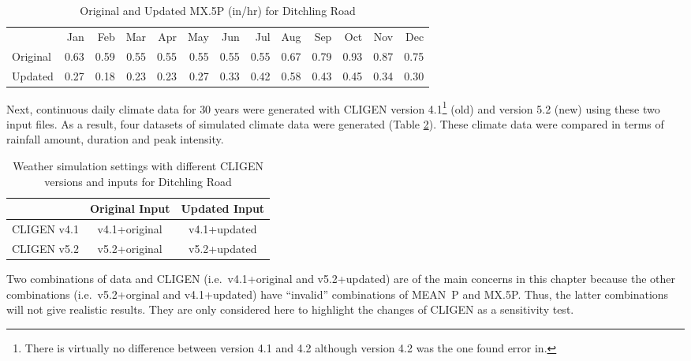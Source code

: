 \begin{table}[htbp]
  \centering
  \caption[Original and Updated {MX.5P} for Ditchling Road]{Original and
Updated {MX.5P} (in/hr) for Ditchling Road}
  \label{tab:UpdatedMX5PForDitchlingRoad}
    \footnotesize
    \begin{tabular}{lrrrrrrrrrrrr}
    \toprule
     & Jan & Feb & Mar & Apr & May & Jun & Jul & Aug & Sep & Oct &
Nov & Dec\\
    \cmidrule{2-13}
    Original & 0.63 & 0.59 & 0.55 & 0.55 & 0.55 & 0.55 & 0.55 & 0.67
& 0.79 & 0.93 & 0.87 & 0.75\\
    Updated & 0.27 & 0.18 & 0.23 & 0.23 & 0.27 & 0.33 & 0.42 & 0.58
& 0.43 & 0.45 & 0.34 & 0.30\\
    \bottomrule
    \end{tabular}
\end{table}

Next, continuous daily climate data for 30 years were generated with CLIGEN
version 4.1\footnote{There is virtually no difference between version 4.1 and
4.2 although version 4.2 was the one \citet{yu2000-301} found error in.} (old)
and version 5.2 (new) using these two input files. As a result, four datasets of
simulated climate data were generated (Table
\ref{tab:CLIGENSimulationSettingsWithDifferentInputsAndVersions}). These climate
data were compared in terms of rainfall amount, duration and peak intensity.

\begin{table}[htbp]
  \centering
  \small
  \caption{Weather simulation settings with different CLIGEN versions and inputs
for Ditchling Road}
  \label{tab:CLIGENSimulationSettingsWithDifferentInputsAndVersions}
  \begin{tabular}{ccc}
  \toprule
        & Original Input & Updated Input \\
  \midrule
  CLIGEN v4.1 & v4.1+original & v4.1+updated \\
  \midrule
  CLIGEN v5.2 & v5.2+original & v5.2+updated \\
  \bottomrule
  \end{tabular}
\end{table}

Two combinations of data and CLIGEN (i.e.\ v4.1+original and v5.2+updated) are
of the main concerns in this chapter because the other combinations (i.e.\
v5.2+orginal and v4.1+updated) have ``invalid'' combinations of MEAN~P and
{MX.5P}. Thus, the latter combinations will not give realistic results.
They are only considered here to highlight the changes of CLIGEN as a
sensitivity test.


